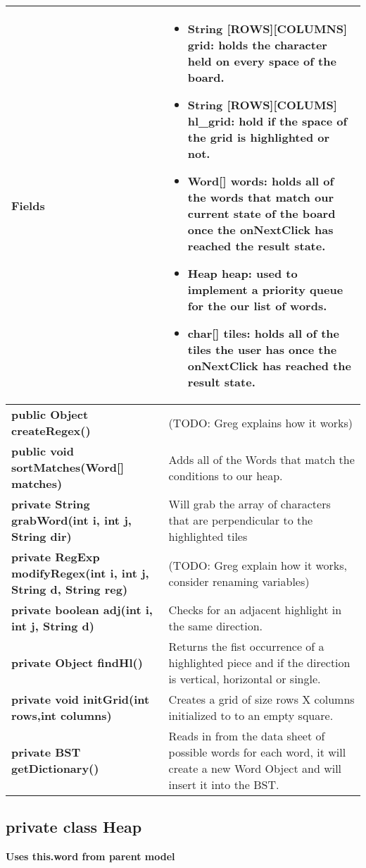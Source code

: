 \documentclass[11pt]{article}
\begin{document}
\begin{tabular}{|p{}|p{}|}
\hline
\textbf{Fields} & 
\begin{itemize}
	\item String  [ROWS][COLUMNS] grid: holds the character held on every space of the board. 
	\item String [ROWS][COLUMS] hl\_grid: hold if the space of the grid is highlighted or not.
	\item Word[] words: holds all of the words that match our current state of the board once the onNextClick has reached the result state.
	\item Heap heap: used to implement a priority queue for the our list of words.
	\item char[] tiles:  holds all of the tiles the user has once the onNextClick has reached the result state.
\end{itemize} \\
\hline
\textbf{public Object createRegex()} & (TODO: Greg explains how it works)\\
%
\hline
\textbf{public void sortMatches(Word[] matches)} & Adds all of the Words that match the conditions to our heap.\\
\hline
\textbf{private String grabWord(int i, int j, String dir)} & Will grab the array of characters that are perpendicular to the highlighted tiles \\
\hline
\textbf{private RegExp modifyRegex(int i, int j, String d, String reg)} &
(TODO: Greg explain how it works,  consider renaming variables)\\
\hline
\textbf{private boolean adj(int i, int j, String d)} & Checks for an adjacent highlight in the same direction. \\
\hline
\textbf{private Object findHl()} & Returns the fist occurrence of a highlighted piece and if the direction is vertical, horizontal or single.\\
\hline
\textbf{private void initGrid(int rows,int columns)} & Creates a grid of size rows X columns initialized to to an empty square. \\
\hline
\textbf{private BST getDictionary()} & Reads in from the data sheet of possible words for each word, it will create a new Word Object and will insert it into the BST.\\
\hline
\end{tabular}

\subsection{private class Heap}
\textbf{Uses this.word from parent model}
\end{document}
